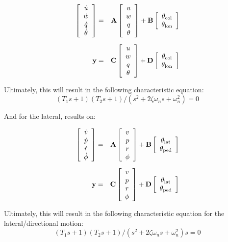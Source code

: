     \begin{eqnarray}
      \left[ \begin{array}{c} \dot{u} \\ \dot{w} \\ \dot{q} \\ \dot{\theta} \end{array} \right] &=& \mathrm{\textbf{A}} \left[ \begin{array}{c} u \\ w \\ q \\ \theta \end{array} \right] + \mathrm{\textbf{B}} \left[ \begin{array}{c} \theta_{\mathrm{col}} \\ \theta_{\mathrm{lon}} \end{array} \right] \\[6pt]
      \mathrm{\textbf{y}} &=& \mathrm{\textbf{C}} \left[ \begin{array}{c} u \\ w \\ q \\ \theta \end{array} \right] + \mathrm{\textbf{D}} \left[ \begin{array}{c} \theta_{\mathrm{col}} \\ \theta_{\mathrm{lon}} \end{array} \right]
    \end{eqnarray}

    Ultimately, this will result in the following characteristic equation: $$(T_1 s + 1) ( T_2 s + 1) / (s^2 + 2\zeta \omega_n s + \omega_n^2) = 0$$

    And for the lateral, results on:

    \begin{eqnarray}
      \left[ \begin{array}{c} \dot{v} \\ \dot{p} \\ \dot{r} \\ \dot{\phi} \end{array} \right] &=& \mathrm{\textbf{A}} \left[ \begin{array}{c} v \\ p \\ r \\ \phi \end{array} \right] + \mathrm{\textbf{B}} \left[ \begin{array}{c} \theta_{\mathrm{lat}} \\ \theta_{\mathrm{ped}} \end{array} \right] \\[6pt]
      \mathrm{\textbf{y}} &=& \mathrm{\textbf{C}} \left[ \begin{array}{c} v \\ p \\ r \\ \phi \end{array} \right] + \mathrm{\textbf{D}} \left[ \begin{array}{c} \theta_{\mathrm{lat}} \\ \theta_{\mathrm{ped}} \end{array} \right]
    \end{eqnarray}

    Ultimately, this will result in the following characteristic equation for the lateral/directional motion: $$(T_1 s + 1) ( T_2 s + 1) / (s^2 + 2\zeta \omega_n s + \omega_n^2) s = 0$$